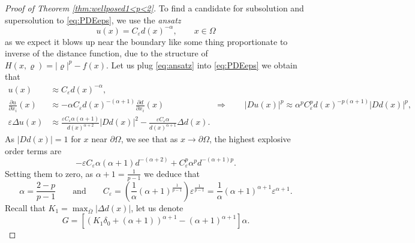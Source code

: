 \documentclass[11pt,reqno]{amsart}
\numberwithin{figure}{section}
\theoremstyle{plain}
\theoremstyle{remark}
\numberwithin{equation}{section}
\begin{document}
\begin{appendices}
\begin{proof} [Proof of Theorem \ref{thm:wellposed1<p<2}] To find a candidate for subsolution and supersolution to \eqref{eq:PDEeps}, we use the \emph{ansatz}
\begin{equation}\label{eq:ansatz}
    u(x) = C_\varepsilon d(x)^{-\alpha}, \qquad x\in \Omega
\end{equation}
as we expect it blows up near the boundary like some thing proportionate to inverse of the distance function, due to the structure of $H(x,\varrho) = |\varrho|^p - f(x)$. Let us plug \eqref{eq:ansatz} into \eqref{eq:PDEeps} we obtain that 
\begin{align*}
      u(x) &\approx C_\varepsilon d(x)^{-\alpha},\\
    \frac{\partial u}{\partial x_i}(x) &\approx -\alpha C_\varepsilon d(x)^{-(\alpha+1)} \frac{\partial d}{\partial x_i}(x) \qquad\qquad\qquad \Longrightarrow\qquad |Du (x)|^p \approx \alpha^p C_\varepsilon^p d(x)^{-p(\alpha+1)}|D d(x)|^p,\\
    \varepsilon\Delta u(x) &\approx \frac{\varepsilon C_\varepsilon\alpha(\alpha+1)}{d(x)^{\alpha+2}}|D d(x)|^2 - \frac{\varepsilon C_\varepsilon\alpha}{d(x)^{\alpha+1}}\Delta d(x).
\end{align*}
As $|D d(x)| = 1$ for $x$ near $\partial\Omega$, we see that as $x\to \partial \Omega$, the highest explosive order terms are
\begin{equation*}
        -\varepsilon C_\varepsilon \alpha(\alpha+1)d^{-(\alpha+2)} + C_\varepsilon^p \alpha^p d^{-(\alpha+1)p}.
\end{equation*}
Setting them to zero, as $\alpha+1 = \frac{1}{p-1}$ we deduce that 
\begin{equation}\label{e:relation}
    \displaystyle\alpha = \frac{2-p}{p-1} \qquad\text{and}\qquad C_\varepsilon = \left(\frac{1}{\alpha}(\alpha+1)^\frac{1}{p-1}\right) \varepsilon^{\frac{1}{p-1}} = \frac{1}{\alpha}(\alpha+1)^{\alpha+1}\varepsilon^{\alpha+1}.
\end{equation}
Recall that $K_1 = \max_{\overline{\Omega}}|\Delta d(x)|$, let us denote
\begin{equation*}
    G = \left[\left(K_1\delta_0+(\alpha+1)\right)^{\alpha+1} - (\alpha+1)^{\alpha+1}\right]\alpha.
\end{equation*}


\end{proof}
\end{appendices}
\end{document}
